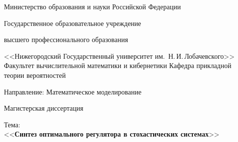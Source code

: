 


\newcommand{\underscore}[1]{\underline{\hspace*{#1cm}}} %
\thispagestyle{empty}


\begin{titlepage}

    \begin{center}
        Министерство образования и науки Российской Федерации\vspace{1.5mm}

        Государственное образовательное учреждение\vspace{0.7mm}

        высшего профессионального образования\vspace{1.5mm}

        <<Нижегородский Государственный университет им.~Н.\,И.\,Лобачевского>>
        \vspace{1.2cm}
        {
             \selectfont
            Факультет вычислительной математики и кибернетики
        }
        \vspace{1.5mm}
        {
             \selectfont
            Кафедра прикладной теории вероятностей
        }

        \vspace{3mm}
        {
            Направление: Математическое моделирование
        }

        \vspace{2cm}

        {
            \fontsize{27pt}{18pt}  \selectfont
            Магистерская диссертация
        }

        \vspace{2cm}

        {
            Тема: \\
            { <<\textbf{Синтез оптимального регулятора в стохастических системах}>>}
        }
    \end{center}


\end{titlepage}

